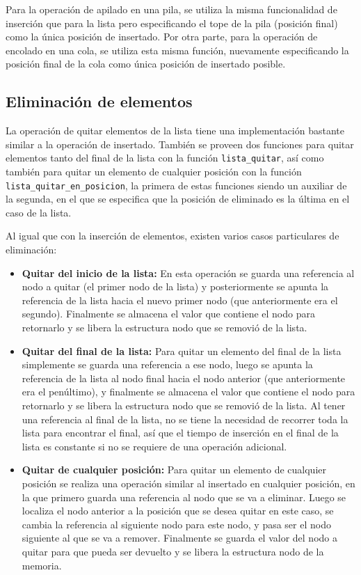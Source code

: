 \documentclass[titlepage,a4paper]{article}
\begin{document}
Para la operación de apilado en una pila, se utiliza la misma funcionalidad de inserción que para la lista pero especificando el tope de la pila (posición final) como la única posición de insertado. Por otra parte, para la operación de encolado en una cola, se utiliza esta misma función, nuevamente especificando la posición final de la cola como única posición de insertado posible.


\subsection{Eliminación de elementos}

La operación de quitar elementos de la lista tiene una implementación bastante similar a la operación de insertado. También se proveen dos funciones para quitar elementos tanto del final de la lista con la función \lstinline{lista_quitar}, así como también para quitar un elemento de cualquier posición con la función \lstinline{lista_quitar_en_posicion}, la primera de estas funciones siendo un auxiliar de la segunda, en el que se especifica que la posición de eliminado es la última en el caso de la lista.

Al igual que con la inserción de elementos, existen varios casos particulares de eliminación:

\begin{itemize}
  \item \textbf{Quitar del inicio de la lista:} En esta operación se guarda una referencia al nodo a quitar (el primer nodo de la lista) y posteriormente se apunta la referencia de la lista hacia el nuevo primer nodo (que anteriormente era el segundo). Finalmente se almacena el valor que contiene el nodo para retornarlo y se libera la estructura nodo que se removió de la lista.
  \item \textbf{Quitar del final de la lista:} Para quitar un elemento del final de la lista simplemente se guarda una referencia a ese nodo, luego se apunta la referencia de la lista al nodo final hacia el nodo anterior (que anteriormente era el penúltimo), y finalmente se almacena el valor que contiene el nodo para retornarlo y se libera la estructura nodo que se removió de la lista. Al tener una referencia al final de la lista, no se tiene la necesidad de recorrer toda la lista para encontrar el final, así que el tiempo de inserción en el final de la lista es constante si no se requiere de una operación adicional.
  \item \textbf{Quitar de cualquier posición:} Para quitar un elemento de cualquier posición se realiza una operación similar al insertado en cualquier posición, en la que primero guarda una referencia al nodo que se va a eliminar. Luego se localiza el nodo anterior a la posición que se desea quitar en este caso, se cambia la referencia al siguiente nodo para este nodo, y pasa ser el nodo siguiente al que se va a remover. Finalmente se guarda el valor del nodo a quitar para que pueda ser devuelto y se libera la estructura nodo de la memoria.
\end{itemize}
\end{document}
